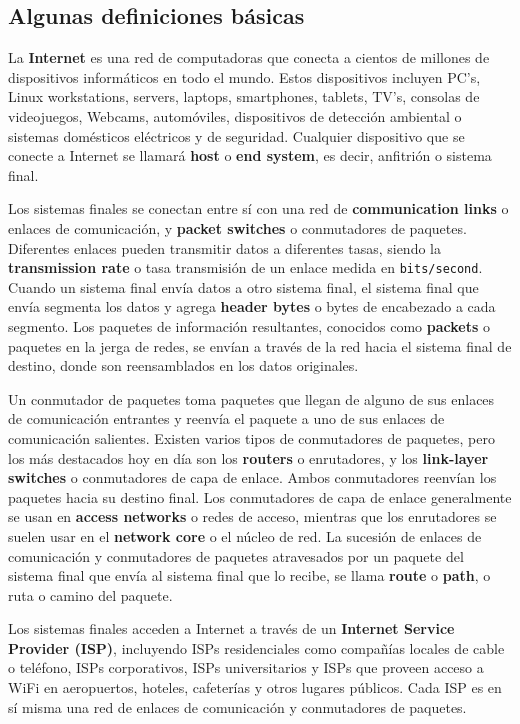 
\subsection{Algunas definiciones básicas}

La \textbf{Internet} es una red de computadoras que conecta a cientos de millones de dispositivos informáticos en todo el mundo. Estos dispositivos incluyen PC's, Linux workstations, servers, laptops, smartphones, tablets, TV's, consolas de videojuegos, Webcams, automóviles, dispositivos de detección ambiental o sistemas domésticos eléctricos y de seguridad. Cualquier dispositivo que se conecte a Internet se llamará \textbf{host} o \textbf{end system}, es decir, anfitrión o sistema final.
\bigskip

Los sistemas finales se conectan entre sí con una red de \textbf{communication links} o enlaces de comunicación, y \textbf{packet switches} o conmutadores de paquetes. Diferentes enlaces pueden transmitir datos a diferentes tasas, siendo la \textbf{transmission rate} o tasa transmisión de un enlace medida en \texttt{bits/second}. Cuando un sistema final envía datos a otro sistema final, el sistema final que envía segmenta los datos y agrega \textbf{header bytes} o bytes de encabezado a cada segmento. Los paquetes de información resultantes, conocidos como \textbf{packets} o paquetes en la jerga de redes, se envían a través de la red hacia el sistema final de destino, donde son reensamblados en los datos originales.
\bigskip

Un conmutador de paquetes toma paquetes que llegan de alguno de sus enlaces de comunicación entrantes y reenvía el paquete a uno de sus enlaces de comunicación salientes. Existen varios tipos de conmutadores de paquetes, pero los más destacados hoy en día son los \textbf{routers} o enrutadores, y los \textbf{link-layer switches} o conmutadores de capa de enlace. Ambos conmutadores reenvían los paquetes hacia su destino final. Los conmutadores de capa de enlace generalmente se usan en \textbf{access networks} o redes de acceso, mientras que los enrutadores se suelen usar en el \textbf{network core} o el núcleo de red. La sucesión de enlaces de comunicación y conmutadores de paquetes atravesados por un paquete del sistema final que envía al sistema final que lo recibe, se llama \textbf{route} o \textbf{path}, o ruta o camino del paquete.
\bigskip

Los sistemas finales acceden a Internet a través de un \textbf{Internet Service Provider (ISP)}, incluyendo ISPs residenciales como compañías locales de cable o teléfono, ISPs corporativos, ISPs universitarios y ISPs que proveen acceso a WiFi en aeropuertos, hoteles, cafeterías y otros lugares públicos. Cada ISP es en sí misma una red de enlaces de comunicación y conmutadores de paquetes.
\bigskip


